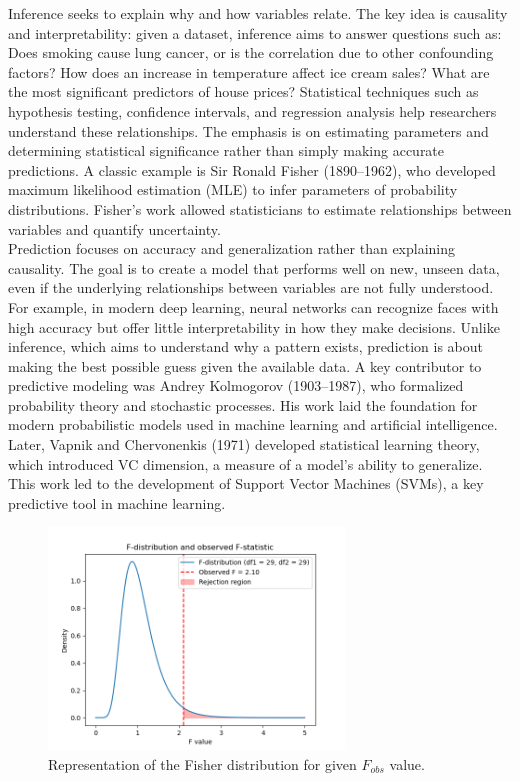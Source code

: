 \documentclass{book}
\begin{document}
Inference seeks to explain why and how variables relate. The key idea is causality and interpretability: given a dataset, inference aims to answer questions such as: Does smoking cause lung cancer, or is the correlation due to other confounding factors? How does an increase in temperature affect ice cream sales? What are the most significant predictors of house prices? Statistical techniques such as hypothesis testing, confidence intervals, and regression analysis help researchers understand these relationships. The emphasis is on estimating parameters and determining statistical significance rather than simply making accurate predictions. A classic example is Sir Ronald Fisher (1890–1962), who developed maximum likelihood estimation (MLE) to infer parameters of probability distributions. Fisher’s work allowed statisticians to estimate relationships between variables and quantify uncertainty.\\

Prediction focuses on accuracy and generalization rather than explaining causality. The goal is to create a model that performs well on new, unseen data, even if the underlying relationships between variables are not fully understood. For example, in modern deep learning, neural networks can recognize faces with high accuracy but offer little interpretability in how they make decisions. Unlike inference, which aims to understand why a pattern exists, prediction is about making the best possible guess given the available data. A key contributor to predictive modeling was Andrey Kolmogorov (1903–1987), who formalized probability theory and stochastic processes. His work laid the foundation for modern probabilistic models used in machine learning and artificial intelligence. Later, Vapnik and Chervonenkis (1971) developed statistical learning theory, which introduced VC dimension, a measure of a model’s ability to generalize. This work led to the development of Support Vector Machines (SVMs), a key predictive tool in machine learning.\\

\begin{figure}[ht]
    \centering
    \includegraphics[width=0.7\textwidth]{figures/chapter4/f_distribution.png}
    \caption{Representation of the Fisher distribution for given $F_{obs}$ value.}
    \label{fig:f_dist}
\end{figure}
\end{document}
